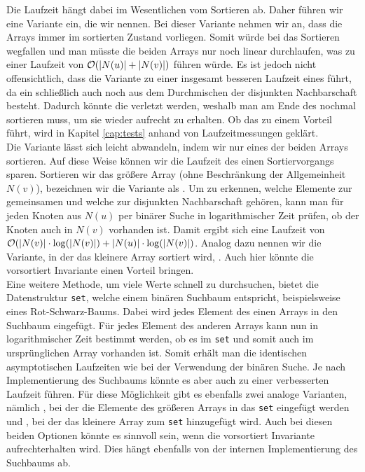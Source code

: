 Die Laufzeit hängt dabei im Wesentlichen vom Sortieren ab. Daher führen wir eine Variante ein, 
die wir  nennen. Bei dieser Variante nehmen wir an, dass
die Arrays immer im sortierten Zustand vorliegen. Somit würde bei \SorSor{} das Sortieren wegfallen
und man müsste die beiden Arrays nur noch linear durchlaufen, was zu einer Laufzeit von $\mathcal{O}(|N(u)| + |N(v)|)$
führen würde. 
Es ist jedoch nicht offensichtlich, dass die Variante zu einer insgesamt besseren Laufzeit eines
 führt, da ein \ct{} schließlich auch noch aus dem Durchmischen der disjunkten Nachbarschaft besteht.
Dadurch könnte die  verletzt werden, weshalb man am Ende des  nochmal sortieren
muss, um sie wieder aufrecht zu erhalten. Ob das  zu einem Vorteil führt, wird in Kapitel 
\ref{cap:tests} anhand von Laufzeitmessungen geklärt.
\\

Die Variante \SorSor{} lässt sich leicht abwandeln, indem wir nur eines der beiden Arrays sortieren.
Auf diese Weise können wir die Laufzeit des einen Sortiervorgangs sparen. Sortieren
wir das größere Array (ohne Beschränkung der Allgemeinheit $N(v)$), bezeichnen wir die Variante als \SorSea{}. Um zu erkennen, 
welche Elemente zur gemeinsamen und welche zur disjunkten Nachbarschaft gehören, kann man für jeden
Knoten aus $N(u)$ per binärer Suche in logarithmischer Zeit prüfen, ob der Knoten auch in $N(v)$ vorhanden ist.
Damit ergibt sich eine Laufzeit von $\mathcal{O}(|N(v)| \cdot \log(|N(v)|) + |N(u)| \cdot \log(|N(v)|)$. Analog dazu
nennen wir die Variante, in der das kleinere Array sortiert wird, \SeaSor. 
Auch hier könnte die vorsortiert Invariante einen Vorteil bringen.
\\

Eine weitere Methode, um viele Werte schnell zu durchsuchen, bietet die Datenstruktur \texttt{set}, welche
einem binären Suchbaum entspricht, beispielsweise eines Rot-Schwarz-Baums.
Dabei wird jedes Element des einen Arrays in den Suchbaum eingefügt. 
Für jedes Element des anderen Arrays kann nun in logarithmischer
Zeit bestimmt werden, ob es im \texttt{set} und somit auch im ursprünglichen Array vorhanden ist.
Somit erhält man die identischen asymptotischen Laufzeiten wie bei der Verwendung der
binären Suche. Je nach Implementierung des Suchbaums könnte es aber auch zu einer verbesserten
Laufzeit führen. 
Für diese Möglichkeit gibt es ebenfalls zwei 
analoge Varianten, nämlich \SetSea, bei der die Elemente des größeren Arrays in das \texttt{set} eingefügt werden
und \SeaSet, bei der das kleinere Array zum \texttt{set} hinzugefügt wird.
Auch bei diesen beiden Optionen könnte es sinnvoll sein, wenn die vorsortiert Invariante aufrechterhalten wird.
Dies hängt ebenfalls von der internen Implementierung des Suchbaums ab.
\\

